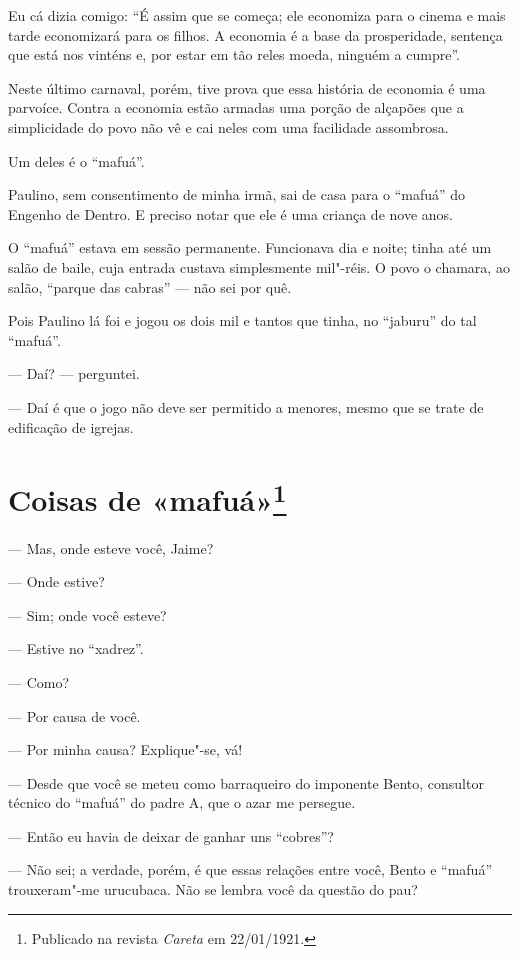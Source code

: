 Eu cá dizia comigo: ``É assim que se começa; ele economiza para o cinema
e mais tarde economizará para os filhos. A economia é a base da
prosperidade, sentença que está nos vinténs e, por estar em tão reles
moeda, ninguém a cumpre''.

Neste último carnaval, porém, tive prova que essa história de economia é
uma parvoíce. Contra a economia estão armadas uma porção de alçapões que
a simplicidade do povo não vê e cai neles com uma facilidade assombrosa.

Um deles é o ``mafuá''.

Paulino, sem consentimento de minha irmã, sai de casa para o ``mafuá''
do Engenho de Dentro. E preciso notar que ele é uma criança de nove
anos.

O ``mafuá'' estava em sessão permanente. Funcionava dia e noite; tinha
até um salão de baile, cuja entrada custava simplesmente mil"-réis. O
povo o chamara, ao salão, ``parque das cabras'' --- não sei por quê.

Pois Paulino lá foi e jogou os dois mil e tantos que tinha, no
``jaburu'' do tal ``mafuá''.

--- Daí? --- perguntei.

--- Daí é que o jogo não deve ser permitido a menores, mesmo que se trate
de edificação de igrejas.



\chapter[Coisas de «mafuá»]{Coisas de «mafuá»\footnote[*]{Publicado na revista \emph{Careta} em 22/01/1921.}}

--- Mas, onde esteve você, Jaime?

--- Onde estive?

--- Sim; onde você esteve?

--- Estive no ``xadrez''.

--- Como?

--- Por causa de você.

--- Por minha causa? Explique"-se, vá!

--- Desde que você se meteu como barraqueiro do imponente Bento,
consultor técnico do ``mafuá'' do padre A, que o azar me persegue.

--- Então eu havia de deixar de ganhar uns ``cobres''?

--- Não sei; a verdade, porém, é que essas relações entre você, Bento e
``mafuá'' trouxeram"-me urucubaca. Não se lembra você da questão do pau?

